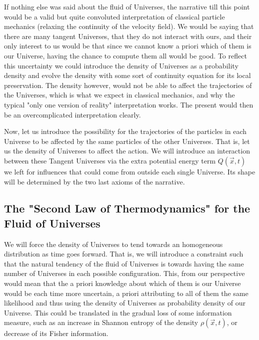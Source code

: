\documentclass[11pt, a4paper]{article} %
\DeclareRobustCommand{\mybox}[2][gray!10]{%
\begin{tcolorbox}[   %
        left=0.2cm,
        right=0.2cm,
        top=0.15cm,
        bottom=0.15cm,
        colback=#1,
        colframe=#1,
        width=\dimexpr\textwidth\relax, 
        enlarge left by=0mm,
        boxsep=5pt,
        arc=0pt,outer arc=0pt,
        ]
        #2
\end{tcolorbox}
}
\begin{document}
\mybox{
If nothing else was said about the fluid of Universes, the narrative till this point would be a valid but quite convoluted interpretation of classical particle mechanics (relaxing the continuity of the velocity field). We would be saying that there are many tangent Universes, that they do not interact with ours, and their only interest to us would be that since we cannot know a priori which of them is our Universe, having the chance to compute them all would be good. To reflect this uncertainty we could introduce the density of Universes as a probability density and evolve the density with some sort of continuity equation for its local preservation. The density however, would not be able to affect the trajectories of the Universes, which is what we expect in classical mechanics, and why the typical "only one version of reality" interpretation works. The present would then be an overcomplicated interpretation clearly.
}

Now, let us introduce the possibility for the trajectories of the particles in each Universe to be affected by the same particles of the other Universes. That is, let us the density of Universes to affect the action. We will introduce an interaction between these Tangent Universes via the extra potential energy term $Q(\vec{x},t)$ we left for influences that could come from outside each single Universe. Its shape will be determined by the two last axioms of the narrative.

\subsection*{The "Second Law of Thermodynamics" for the Fluid of Universes}

We will force the density of Universes to tend towards an homogeneous distribution as time goes forward. That is, we will introduce a constraint such that the natural tendency of the fluid of Universes is towards having the same number of Universes in each possible configuration. This, from our perspective would mean that the a priori knowledge about which of them is our Universe would be each time more uncertain, a priori attributing to all of them the same likelihood and thus using the density of Universes as probability density of our Universe. This could be translated in the gradual loss of some information measure, such as an increase in Shannon entropy of the density $\rho(\vec{x},t)$, or decrease of its Fisher information.
\end{document}
